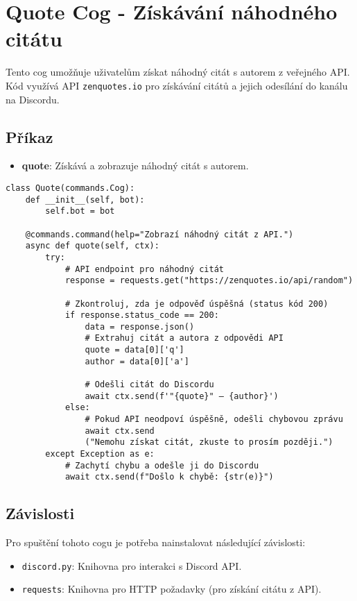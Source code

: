 \documentclass[12pt, a4paper]{report}
\begin{document}
\section{Quote Cog - Získávání náhodného citátu}
Tento cog umožňuje uživatelům získat náhodný citát s autorem z veřejného API. Kód využívá API \texttt{zenquotes.io} pro získávání citátů a jejich odesílání do kanálu na Discordu.

\subsection{Příkaz}

\begin{itemize}
    \item \textbf{quote}: Získává a zobrazuje náhodný citát s autorem.
\end{itemize}

\begin{lstlisting}[style=Python, caption=Získávání náhodného citátu z API]
class Quote(commands.Cog):
    def __init__(self, bot):
        self.bot = bot

    @commands.command(help="Zobrazí náhodný citát z API.")
    async def quote(self, ctx):
        try:
            # API endpoint pro náhodný citát
            response = requests.get("https://zenquotes.io/api/random")

            # Zkontroluj, zda je odpověď úspěšná (status kód 200)
            if response.status_code == 200:
                data = response.json()
                # Extrahuj citát a autora z odpovědi API
                quote = data[0]['q']
                author = data[0]['a']

                # Odešli citát do Discordu
                await ctx.send(f'"{quote}" – {author}')
            else:
                # Pokud API neodpoví úspěšně, odešli chybovou zprávu
                await ctx.send
                ("Nemohu získat citát, zkuste to prosím později.")
        except Exception as e:
            # Zachytí chybu a odešle ji do Discordu
            await ctx.send(f"Došlo k chybě: {str(e)}")
\end{lstlisting}

\subsection{Závislosti}

Pro spuštění tohoto cogu je potřeba nainstalovat následující závislosti:

\begin{itemize}
    \item \texttt{discord.py}: Knihovna pro interakci s Discord API.
    \item \texttt{requests}: Knihovna pro HTTP požadavky (pro získání citátu z API).
\end{itemize}
\end{document}
